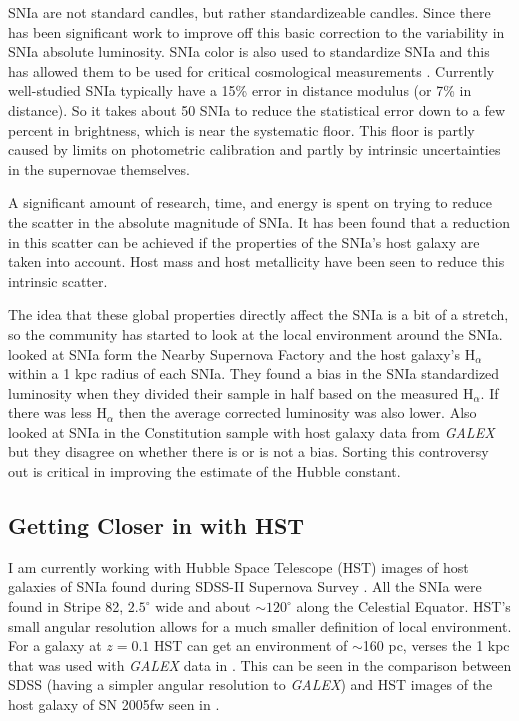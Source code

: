 \documentclass[apj, iop]{emulateapj}
\newcommand{\sn}{SNIa}
\newcommand{\todo}[1]{\textbf{\textcolor{red}{#1}}}
\newcommand{\Hubble}{\ensuremath{\text{H}_0}}
\begin{document}
\sn{} are not standard candles, but rather standardizeable candles. Since
\cite{Phillips93} there has been significant work to improve off this basic
correction to the variability in \sn{} absolute luminosity. \sn{} color is also
used to standardize \sn{} and this has allowed them to be used for critical
cosmological measurements \citep{Riess98, Perlmutter99}. Currently well-studied
\sn{} typically have a 15\% error in distance modulus (or 7\% in
distance). So it takes about 50 \sn{} to reduce the statistical error down to a
few percent in brightness, which is near the systematic floor. This floor
is partly caused by limits on photometric calibration and partly by intrinsic
uncertainties in the supernovae themselves.

A significant amount of research, time, and energy is spent on trying to reduce
the scatter in the absolute magnitude of \sn{}. It has been found that a
reduction in this scatter can be achieved if the properties of the \sn{}'s host
galaxy are taken into account. Host mass \citep{Childress13} and host
metallicity \citep{Hayden13} have been seen to reduce this intrinsic scatter.

The idea that these global properties directly affect the \sn{} is a bit of a
stretch, so the community has started to look at the local environment around
the \sn{}. \cite{Rigault13} looked at \sn{} form the Nearby Supernova Factory
and the host galaxy's $\text{H}_{\alpha}$ within a 1 kpc radius of each \sn{}.
They found a bias in the \sn{} standardized luminosity when they divided their
sample in half based on the measured $\text{H}_{\alpha}$. If there was less
$\text{H}_{\alpha}$ then the average corrected luminosity was also lower.  Also
\cite{Rigault15, Jones15} looked at \sn{} in the Constitution sample with host
galaxy data from {\it GALEX} but they disagree on whether there is or is not a
bias.
Sorting this controversy out is critical in improving the estimate of the
Hubble constant.

\subsection{Getting Closer in with HST}\label{hst}

I am currently working with Hubble Space Telescope (HST) images of host galaxies
of \sn{} found during SDSS-II Supernova Survey
\citep{2008AJ....135..338F,2008AJ....135..348S}. All the \sn{} were found in
Stripe 82, $2.5^{\circ}$ wide and about $\sim120^{\circ}$ along the Celestial
Equator. HST's small angular resolution allows for a much smaller definition of
local environment. For a galaxy at $z = 0.1$ HST can get an environment of
$\sim$160 pc, verses the 1 kpc that was used with {\it GALEX} data in
\cite{Jones15,Rigault15}. This can be seen in the comparison between SDSS
(having a simpler angular resolution to {\it GALEX}) and HST images of the host
galaxy of SN 2005fw seen in .
\end{document}
